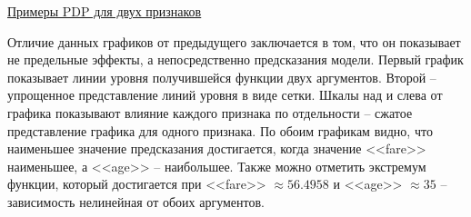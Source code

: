 \underline{Примеры PDP для двух признаков}
\vspace{-3mm}

\begin{figure}[h]
\end{figure}
\vspace{-5mm}
\begin{figure}[h!]
\end{figure}

Отличие данных графиков от предыдущего заключается в том, что он показывает не предельные эффекты, а непосредственно предсказания модели. Первый график показывает линии уровня получившейся функции двух аргументов. Второй -- упрощенное представление линий уровня в виде сетки. Шкалы над и слева от графика показывают влияние каждого признака по отдельности -- сжатое представление графика для одного признака. По обоим графикам видно, что наименьшее значение предсказания достигается, когда значение <<fare>> наименьшее, а <<age>> -- наибольшее. Также можно отметить экстремум функции, который достигается при <<fare>> $\approx 56.4958$ и <<age>> $\approx 35$ -- зависимость нелинейная от обоих аргументов.